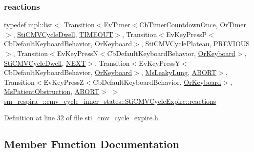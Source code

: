\subsubsection{\texorpdfstring{reactions}{reactions}}
{\footnotesize\ttfamily typedef mpl\+::list$<$ Transition$<$Ev\+Timer$<$Cb\+Timer\+Countdown\+Once, \hyperlink{classsm__respira__1_1_1OrTimer}{Or\+Timer}$>$, \hyperlink{structsm__respira__1_1_1cmv__cycle__inner__states_1_1StiCMVCycleDwell}{Sti\+C\+M\+V\+Cycle\+Dwell}, \hyperlink{structsm__respira__1_1_1cmv__cycle__inner__states_1_1StiCMVCycleExpire_1_1TIMEOUT}{T\+I\+M\+E\+O\+UT}$>$, Transition$<$Ev\+Key\+PressP$<$Cb\+Default\+Keyboard\+Behavior, \hyperlink{classsm__respira__1_1_1OrKeyboard}{Or\+Keyboard}$>$, \hyperlink{structsm__respira__1_1_1cmv__cycle__inner__states_1_1StiCMVCyclePlateau}{Sti\+C\+M\+V\+Cycle\+Plateau}, \hyperlink{structsm__respira__1_1_1cmv__cycle__inner__states_1_1StiCMVCycleExpire_1_1PREVIOUS}{P\+R\+E\+V\+I\+O\+US}$>$, Transition$<$Ev\+Key\+PressN$<$Cb\+Default\+Keyboard\+Behavior, \hyperlink{classsm__respira__1_1_1OrKeyboard}{Or\+Keyboard}$>$, \hyperlink{structsm__respira__1_1_1cmv__cycle__inner__states_1_1StiCMVCycleDwell}{Sti\+C\+M\+V\+Cycle\+Dwell}, \hyperlink{structsm__respira__1_1_1cmv__cycle__inner__states_1_1StiCMVCycleExpire_1_1NEXT}{N\+E\+XT}$>$, Transition$<$Ev\+Key\+PressY$<$Cb\+Default\+Keyboard\+Behavior, \hyperlink{classsm__respira__1_1_1OrKeyboard}{Or\+Keyboard}$>$, \hyperlink{classsm__respira__1_1_1MsLeakyLung}{Ms\+Leaky\+Lung}, \hyperlink{classABORT}{A\+B\+O\+RT}$>$, Transition$<$Ev\+Key\+PressZ$<$Cb\+Default\+Keyboard\+Behavior, \hyperlink{classsm__respira__1_1_1OrKeyboard}{Or\+Keyboard}$>$, \hyperlink{classsm__respira__1_1_1MsPatientObstruction}{Ms\+Patient\+Obstruction}, \hyperlink{classABORT}{A\+B\+O\+RT}$>$ $>$ \hyperlink{structsm__respira__1_1_1cmv__cycle__inner__states_1_1StiCMVCycleExpire_a372e595223d128c8512be88c04bd28af}{sm\+\_\+respira\+\_\+::cmv\+\_\+cycle\+\_\+inner\+\_\+states\+::\+Sti\+C\+M\+V\+Cycle\+Expire\+::reactions}}



Definition at line 32 of file sti\+\_\+cmv\+\_\+cycle\+\_\+expire.\+h.



\subsection{Member Function Documentation}
\mbox{\label{structsm__respira__1_1_1cmv__cycle__inner__states_1_1StiCMVCycleExpire_a8970275dfac3a6981f24603ba17d5f57}} 
